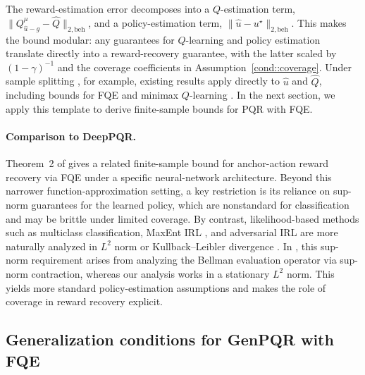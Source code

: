 \documentclass{article}
\newcommand{\1}{\mathbbm{1}}
\begin{document}
The reward-estimation error decomposes into a \(Q\)-estimation term,
\(\|Q^\mu_{\hat u-g}-\hat Q\|_{2,\mathrm{beh}}\), and a policy-estimation
term, \(\|\hat u-u^\star\|_{2,\mathrm{beh}}\). This makes the bound modular:
any guarantees for \(Q\)-learning and policy estimation translate directly into
a reward-recovery guarantee, with the latter scaled by \((1-\gamma)^{-1}\) and
the coverage coefficients in Assumption~\ref{cond::coverage}. Under sample
splitting \citep{foster2023orthogonal}, for example, existing results apply
directly to \(\hat u\) and \(\hat Q\), including bounds for FQE
\citep{munos2008finite,van2025fitted} and minimax \(Q\)-learning
\citep{uehara2020minimax}. In the next section, we apply this
template to derive finite-sample bounds for PQR with FQE.

\paragraph{Comparison to DeepPQR.}
Theorem~2 of \citet{geng2020deep} gives a related finite-sample bound for
anchor-action reward recovery via FQE under a specific neural-network
architecture. Beyond this narrower function-approximation setting, a key
restriction is its reliance on sup-norm guarantees for the learned policy,
which are nonstandard for classification and may be brittle under limited
coverage. By contrast, likelihood-based methods such as multiclass
classification, MaxEnt IRL \citep{ziebart2008maximum}, and adversarial IRL
\citep{fu2018airl} are more naturally analyzed in \(L^2\) norm or
Kullback--Leibler divergence
\citep{snoswell2020revisiting,ke2020imitation,foster2024behavior}. In
\citet{geng2020deep}, this sup-norm requirement arises from analyzing the
Bellman evaluation operator via sup-norm contraction, whereas our analysis
works in a stationary \(L^2\) norm. This yields more standard
policy-estimation assumptions and makes the role of coverage in reward
recovery explicit.
 

 

\subsection{Generalization conditions for GenPQR with FQE}
\label{sec:theory2}
\end{document}

